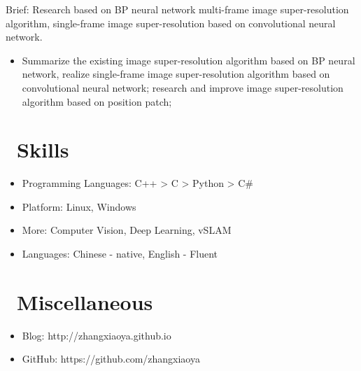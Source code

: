 \documentclass{resume}
\begin{document}
Brief: Research based on BP neural network multi-frame image super-resolution algorithm, single-frame image super-resolution based on convolutional neural network.
\begin{itemize}
  \item Summarize the existing image super-resolution algorithm based on BP neural network, realize single-frame image super-resolution algorithm based on convolutional neural network; research and improve image super-resolution algorithm based on position patch;
\end{itemize}


\section{\faCogs\ Skills}
\begin{itemize}[parsep=0.5ex]
  \item Programming Languages: C++ > C > Python > C\#
  \item Platform: Linux, Windows
  \item More: Computer Vision, Deep Learning, vSLAM
  \item Languages: Chinese - native, English - Fluent
\end{itemize}


\section{\faInfo\ Miscellaneous}
\begin{itemize}[parsep=0.5ex]
  \item Blog: http://zhangxiaoya.github.io
  \item GitHub: https://github.com/zhangxiaoya
\end{itemize}
\end{document}
